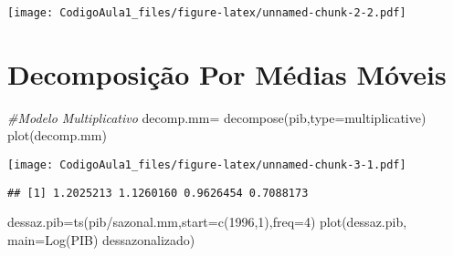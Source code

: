 \documentclass[
]{article}
\newenvironment{Shaded}{\begin{snugshade}}{\end{snugshade}}
\newcommand{\AttributeTok}[1]{\textcolor[rgb]{0.77,0.63,0.00}{#1}}
\newcommand{\CommentTok}[1]{\textcolor[rgb]{0.56,0.35,0.01}{\textit{#1}}}
\newcommand{\DecValTok}[1]{\textcolor[rgb]{0.00,0.00,0.81}{#1}}
\newcommand{\FunctionTok}[1]{\textcolor[rgb]{0.00,0.00,0.00}{#1}}
\newcommand{\NormalTok}[1]{#1}
\newcommand{\OtherTok}[1]{\textcolor[rgb]{0.56,0.35,0.01}{#1}}
\newcommand{\SpecialCharTok}[1]{\textcolor[rgb]{0.00,0.00,0.00}{#1}}
\newcommand{\StringTok}[1]{\textcolor[rgb]{0.31,0.60,0.02}{#1}}
\begin{document}
\texttt{[image: CodigoAula1\_files/figure-latex/unnamed-chunk-2-2.pdf]}

\hypertarget{decomposiuxe7uxe3o-por-muxe9dias-muxf3veis}{%
\section{Decomposição Por Médias
Móveis}\label{decomposiuxe7uxe3o-por-muxe9dias-muxf3veis}}

\begin{Shaded}
\begin{Highlighting}[]
\CommentTok{\#Modelo Multiplicativo}
\NormalTok{decomp.mm}\OtherTok{=} \FunctionTok{decompose}\NormalTok{(pib,}\AttributeTok{type=}\StringTok{\textquotesingle{}multiplicative\textquotesingle{}}\NormalTok{)}
\FunctionTok{plot}\NormalTok{(decomp.mm)}
\end{Highlighting}
\end{Shaded}

\texttt{[image: CodigoAula1\_files/figure-latex/unnamed-chunk-3-1.pdf]}

\begin{Shaded}
\end{Shaded}

\begin{verbatim}
## [1] 1.2025213 1.1260160 0.9626454 0.7088173
\end{verbatim}

\begin{Shaded}
\begin{Highlighting}[]
\NormalTok{dessaz.pib}\OtherTok{=}\FunctionTok{ts}\NormalTok{(pib}\SpecialCharTok{/}\NormalTok{sazonal.mm,}\AttributeTok{start=}\FunctionTok{c}\NormalTok{(}\DecValTok{1996}\NormalTok{,}\DecValTok{1}\NormalTok{),}\AttributeTok{freq=}\DecValTok{4}\NormalTok{)}
\FunctionTok{plot}\NormalTok{(dessaz.pib, }\AttributeTok{main=}\StringTok{\textquotesingle{}Log(PIB) dessazonalizado\textquotesingle{}}\NormalTok{)}
\end{Highlighting}
\end{Shaded}
\end{document}
